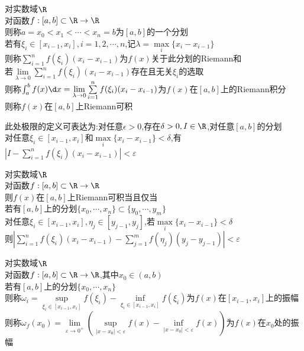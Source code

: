 \begin{dingyi}
对实数域$\R$\\
对函数$f:[a,b]\subset \R \to \R$\\
则称$a=x_0<x_1<\cdots<x_n=b$为$[a,b]$的一个分划\\
若有$\xi_{i}\in [x_{i-1},x_{i}],i=1,2,\cdots,n$,记$\lambda=\max\limits_{i}\{x_i-x_{i-1}\}$\\
则称$\sum\limits_{i=1}^{n}f(\xi_{i})(x_{i}-x_{i-1})$为$f(x)$关于此分划的Riemann和\\
若$\lim\limits_{\lambda\to 0}\sum\limits_{i=1}^{n}f(\xi_{i})(x_{i}-x_{i-1})$存在且无关$\xi_{i}$的选取\\
则称$\int_{a}^{b}f(x)\d x=\lim\limits_{\lambda\to 0}\sum\limits_{i=1}^{n}f(\xi_{i})(x_{i}-x_{i-1})$为$f(x)$在$[a,b]$上的Riemann积分\\
则称$f(x)$在$[a,b]$上Riemann可积
\end{dingyi}

\begin{zhu}
此处极限的定义可表达为:对任意$\epsilon>0$,存在$\delta>0,I\in\R$,对任意$[a,b]$的分划\\
对任意$\xi_i\in[x_{i-1},x_i]$和$\max\limits_{i}\{x_i-x_{i-1}\}<\delta$,有$|I-\sum\limits_{i=1}^{n}f(\xi_{i})(x_{i}-x_{i-1})|<\varepsilon$
\end{zhu}

\begin{dingli}
对实数域$\R$\\
对函数$f:[a,b]\subset \R \to \R$\\
则$f(x)$在$[a,b]$上Riemann可积当且仅当\\
若有$[a,b]$上的分划$\{x_0,\cdots,x_n\}\subset\{y_0,\cdots,y_m\}$\\
对任意$\xi_i\in[x_{i-1},x_i],\eta_j\in[y_{j-1},y_j]$,若$\max\limits_{i}\{x_i-x_{i-1}\}<\delta$\\
则$|\sum\limits_{i=1}^{n}f(\xi_i)(x_i-x_{i-1})-\sum\limits_{j=1}^{m}f(\eta_{j})(y_j-y_{j-1})|<\varepsilon$
\end{dingli}

\begin{dingyi}
对实数域$\R$\\
对函数$f:[a,b]\subset \R \to \R$,其中$x_0\in(a,b)$\\
若有$[a,b]$上的分划$\{x_0,\cdots,x_n\}$\\
则称$\omega_{i}=\sup\limits_{\xi_{i}\in[x_{i-1},x_i]}f(\xi_{i})-\inf\limits_{\xi_{i}\in[x_{i-1},x_i]}f(\xi_i)$为$f(x)$在$[x_{i-1},x_i]$上的振幅\\
则称$\omega_{f}(x_0)=\lim\limits_{\varepsilon\to 0^{+}}(\sup\limits_{|x-x_0|<\varepsilon}f(x)-\inf\limits_{|x-x_0|<\varepsilon}f(x))$为$f(x)$在$x_0$处的振幅
\end{dingyi}

